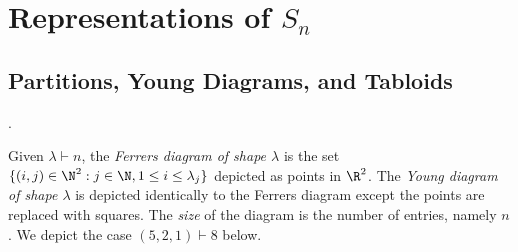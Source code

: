 \documentclass[../main.tex]{subfiles}
\begin{document}
\section{Representations of $ S_{n} $}

\subsection{Partitions, Young Diagrams, and Tabloids}.
\begin{definition}\label{def:youngdiagram}
  Given $ \lambda\vdash n $, the \textit{Ferrers diagram of shape $ \lambda $} is the set $\{(i,j)\in \N^{2} : j\in \N, 1\leq i \leq \lambda_{j}\}$ depicted as points in $ \R^{2} $. The \textit{Young diagram of shape $ \lambda $} is depicted identically to the Ferrers diagram except the points are replaced with squares. The \textit{size} of the diagram is the number of entries, namely $ n $. We depict the case $ (5,2,1)\vdash 8 $ below.
\end{definition}
\end{document}
